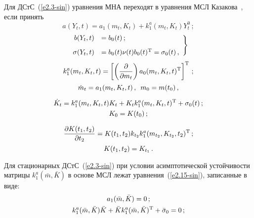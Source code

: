 \begin{multicols}{2}
Для ДСтС~(\ref{e2.3-sin}) уравнения МНА переходят в уравнения МСЛ
Казакова~\cite{2-sin, 3-sin}, если принять
\begin{equation}
a(Y_t,t) = a_1 (m_t, K_t) + k_1^a (m_t, K_t) Y_t^0\,;\label{e2.17-sin}
\end{equation}
\begin{equation}\left.
\begin{array}{rl}
b(Y_t,t) &= b_0 (t)\,;\\[9pt]
    \sigma(Y_t, t)&= b_0(t) \nu(t) b_0(t)^{\mathrm{T}} = \sigma_0(t)\,,
    \end{array}
    \right\}\label{e2.18-sin}
    \end{equation}
    \begin{equation}
k_1^a (m_t, K_t, t) =\left[ \left(\displaystyle\frac{\displaystyle \partial\mathstrut}{\displaystyle \partial m_t\mathstrut} \right)
    a_0 (m_t, K_t, t)^{\mathrm{T}}\right]^{\mathrm{T}}\,;\label{e2.19-sin}
    \end{equation}
    \begin{equation}
\dot m_t = a_1 (m_t, K_t, t) \,,\enskip m_0 = m(t_0)\,,\label{e2.20-sin}
\end{equation}

\vspace*{-12pt}

\noindent
\begin{multline}
\dot K_t = k_1^a (m_t, K_t, t) K_t + K_t k_1^a (m_t, K_t, t)^{\mathrm{T}}
    +\sigma_0(t)\,;\\
    K_0 = K(t_0)\,;
    \label{e2.21-sin}
    \end{multline}

    \vspace*{-12pt}

    \noindent
\begin{multline}
\displaystyle\frac{\displaystyle \partial K(t_1, t_2)\mathstrut}{\displaystyle \partial t_2\mathstrut} =
    K(t_1, t_2) k_{t_2} k_1^a (m_{t_2}, K_{t_2}, t_2)^{\mathrm{T}}\,;\\
    K(t_1, t_2) = K_{t_1}\,.
    \label{e2.22-sin}
\end{multline}

Для стационарных ДСтС~(\ref{e2.3-sin})
при условии асимптотической устойчивости матрицы $k_1^a (\bar m, \bar K)$
в основе МСЛ лежат уравнения~(\ref{e2.15-sin}), записанные в виде:
    \begin{gather}
    a_1 (\bar m, \bar K) =0\,; \label{e2.23-sin}\\
k_1^a (\bar m, \bar K) \bar K + \bar K k_1^a
(\bar m, \bar K)^{\mathrm{T}} +\bar {\sigma}_0 =0\,;\label{e2.24-sin}
\end{gather}


\end{multicols}
